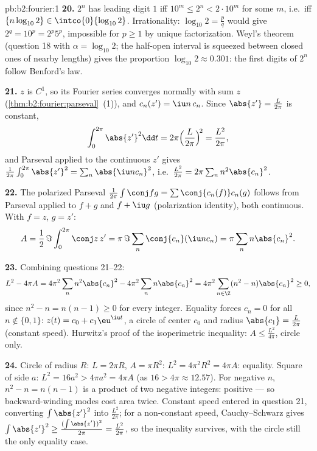 \begin{solution}{pb:b2:fourier:1}
\textbf{20.} $2^n$ has leading digit $1$ iff $10^m \leq 2^n <
2\cdot10^m$ for some $m$, i.e.\ iff $\{n\log_{10}2\} \in
\intco{0}{\log_{10}2}$. Irrationality: $\log_{10}2 =
\frac pq$ would give $2^q = 10^p = 2^p5^p$, impossible for $p
\geq 1$ by unique factorization. Weyl's theorem (question 18
with $\alpha = \log_{10}2$; the half-open interval is squeezed
between closed ones of nearby lengths) gives the proportion
$\log_{10}2 \approx 0.301$: the first digits of $2^n$ follow
Benford's law.

\textbf{21.} $z$ is $C^1$, so its Fourier series converges
normally with sum $z$ (\cref{thm:b2:fourier:parseval}~(1)),
and $c_n(z') = \iu n\,c_n$. Since $\abs{z'} = \frac{L}{2\pi}$
is constant,
\[
\int_0^{2\pi}\abs{z'}^2\dd t
= 2\pi\Bigl(\frac{L}{2\pi}\Bigr)^{\!2}
= \frac{L^2}{2\pi} ,
\]
and Parseval applied to the continuous $z'$ gives
$\frac{1}{2\pi}\int_0^{2\pi}\abs{z'}^2 =
\sum_n\abs{\iu nc_n}^2$, i.e.\ $\frac{L^2}{2\pi} = 2\pi\sum_n
n^2\abs{c_n}^2$.

\textbf{22.} The polarized Parseval $\frac{1}{2\pi}\int\conj
fg = \sum\conj{c_n(f)}c_n(g)$ follows from Parseval applied to
$f + g$ and $f + \iu g$ (polarization identity), both
continuous. With $f = z$, $g = z'$:
\[
A = \frac12\,\Im\int_0^{2\pi}\conj z\,z'
= \pi\,\Im\sum_n\conj{c_n}(\iu n c_n)
= \pi\sum_n n\abs{c_n}^2 .
\]

\textbf{23.} Combining questions 21--22:
\[
L^2 - 4\pi A
= 4\pi^2\sum_n n^2\abs{c_n}^2 -
4\pi^2\sum_n n\abs{c_n}^2
= 4\pi^2\sum_{n\in\Z}(n^2 - n)\abs{c_n}^2 \geq 0 ,
\]
since $n^2 - n = n(n-1) \geq 0$ for every integer. Equality
forces $c_n = 0$ for all $n \notin \{0, 1\}$: $z(t) = c_0 +
c_1\eu^{\iu t}$, a circle of center $c_0$ and radius
$\abs{c_1} = \frac{L}{2\pi}$ (constant speed). Hurwitz's proof
of the isoperimetric inequality: $A \leq \frac{L^2}{4\pi}$,
circle only.

\textbf{24.} Circle of radius $R$: $L = 2\pi R$, $A = \pi
R^2$: $L^2 = 4\pi^2R^2 = 4\pi A$: equality. Square of side
$a$: $L^2 = 16a^2 > 4\pi a^2 = 4\pi A$ (as $16 > 4\pi \approx
12.57$). For negative $n$, $n^2 - n = n(n - 1)$ is a product
of two negative integers: positive --- so backward-winding
modes cost area twice. Constant speed entered in question 21,
converting $\int\abs{z'}^2$ into $\frac{L^2}{2\pi}$; for a
non-constant speed, Cauchy--Schwarz gives $\int\abs{z'}^2 \geq
\frac{(\int\abs{z'})^2}{2\pi} = \frac{L^2}{2\pi}$, so the
inequality survives, with the circle still the only equality
case.


\end{solution}
